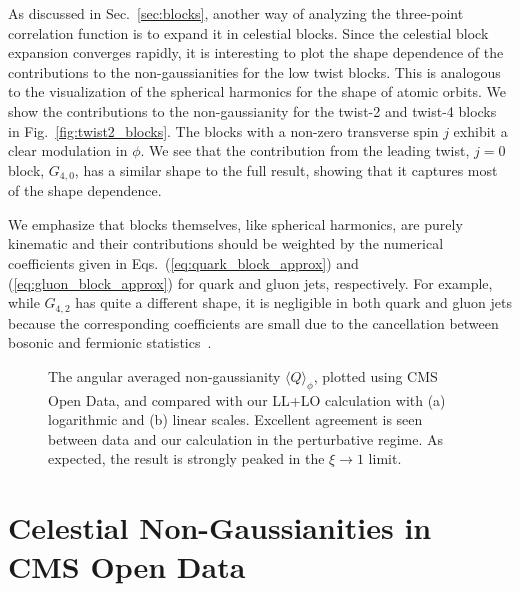 \documentclass[letterpaper,11pt]{article}
\def\Fig#1{Fig.~{\ref{#1}}}
\def\to{\rightarrow}
\DeclareRobustCommand{\Sec}[1]{Sec.~\ref{#1}}
\DeclareRobustCommand{\Fig}[1]{Fig.~\ref{#1}}
\DeclareRobustCommand{\Eqs}[2]{Eqs.~(\ref{#1}) and (\ref{#2})}
\begin{document}
As discussed in \Sec{sec:blocks}, another way of analyzing the three-point correlation function is to expand it in celestial blocks.
%
Since the celestial block expansion converges rapidly, it is interesting to plot the shape dependence of the contributions to the non-gaussianities for the low twist blocks.
%
This is analogous to the visualization of the spherical harmonics for the shape of atomic orbits.
%
We show the contributions to the non-gaussianity for the twist-2 and twist-4 blocks in \Fig{fig:twist2_blocks}.
%
The blocks with a non-zero transverse spin $j$ exhibit a clear modulation in $\phi$.
%
We see that the contribution from the leading twist, $j=0$ block, $G_{4,0}$, has a similar shape to the full result, showing that it captures most of the shape dependence.


We emphasize that blocks themselves, like spherical harmonics, are purely kinematic and their contributions should be weighted by the numerical coefficients given in \Eqs{eq:quark_block_approx}{eq:gluon_block_approx} for quark and gluon jets, respectively.
%
For example, while $G_{4,2}$ has quite a different shape, it is negligible in both quark and gluon jets because the corresponding coefficients are small due to the cancellation between bosonic and fermionic statistics~\cite{Chen:2020adz,Chen:2021gdk}.




\begin{figure}
\begin{center}
\qquad
\end{center}
\caption{
%
The angular averaged non-gaussianity $\langle Q \rangle_\phi$, plotted using CMS Open Data, and compared with our LL+LO calculation with (a) logarithmic and (b) linear scales. Excellent agreement is seen between data and our calculation in the perturbative regime. As expected, the result is strongly peaked in the $\xi\to 1$ limit. }
\label{fig:OD_average}
\end{figure}



\section{Celestial Non-Gaussianities in CMS Open Data}\label{sec:open_data}
\end{document}
